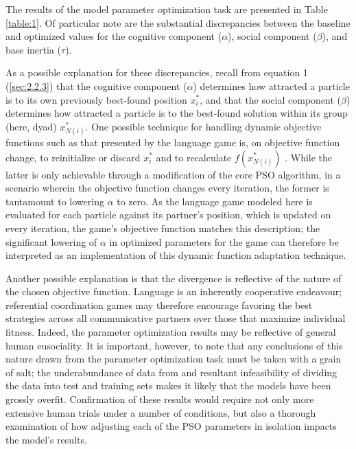 \documentclass[11pt]{article}
\begin{document}
The results of the model parameter optimization task are presented in Table \ref{table:1}. Of particular note are the substantial discrepancies between the baseline and optimized values for the cognitive component ($\alpha$), social component ($\beta$), and base inertia ($\tau$).

As a possible explanation for these discrepancies, recall from equation 1 (\ref{sec:2.2.3}) that the cognitive component ($\alpha$) determines how attracted a particle is to its own previously best-found position $x_i^*$, and that the social component ($\beta$) determines how attracted a particle is to the best-found solution within its group (here, dyad) $x_{N(i)}^*$. One possible technique for handling dynamic objective functions such as that presented by the \citeauthor{rohde2012} language game is, on objective function change, to reinitialize or discard $x_i^*$ and to recalculate $f(x_{N(i)}^*)$ \citep{engelbrecht2005}. While the latter is only achievable through a modification of the core PSO algorithm, in a scenario wherein the objective function changes every iteration, the former is tantamount to lowering $\alpha$ to zero. As the language game modeled here is evaluated for each particle against its partner's position, which is updated on every iteration, the game's objective function matches this description; the significant lowering of $\alpha$ in optimized parameters for the game can therefore be interpreted as an implementation of this dynamic function adaptation technique.

Another possible explanation is that the divergence is reflective of the nature of the chosen objective function. Language is an inherently cooperative endeavour; referential coordination games may therefore encourage favoring the best strategies across all communicative partners over those that maximize individual fitness. Indeed, the parameter optimization results may be reflective of general human eusociality. It is important, however, to note that any conclusions of this nature drawn from the parameter optimization task must be taken with a grain of salt; the underabundance of data from \citeauthor{rohde2012} and resultant infeasibility of dividing the data into test and training sets makes it likely that the models have been grossly overfit. Confirmation of these results would require not only more extensive human trials under a number of conditions, but also a thorough examination of how adjusting each of the PSO parameters in isolation impacts the model's results.
\end{document}
